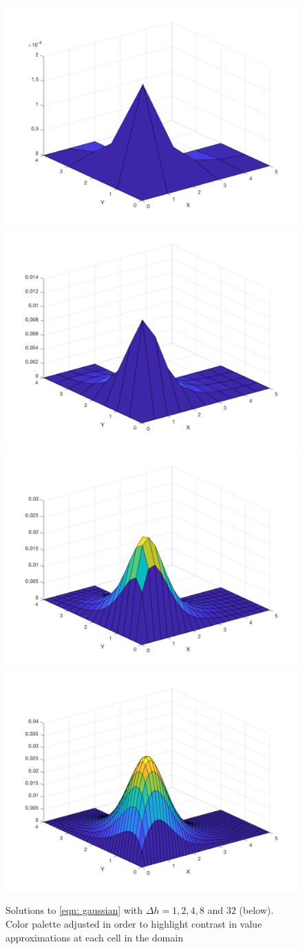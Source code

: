 \documentclass[10pt,a4paper]{article}
\begin{document}
\begin{figure}[H]
\includegraphics[width=0.5\linewidth]{figures/gaussian-h1.png}
\includegraphics[width=0.5\linewidth]{figures/gaussian-h2.png}
\includegraphics[width=0.5\linewidth]{figures/gaussian-h4.png}
\includegraphics[width=0.5\linewidth]{figures/gaussian-h8.png}
\caption{Solutions to \cref{eqn: gaussian} with $\Delta h = 1, 2, 4, 8 $ and $32$ (below). Color palette adjusted in order to highlight contrast in value approximations at each cell in the domain}
\label{fig: steps}
\end{figure}
\end{document}
